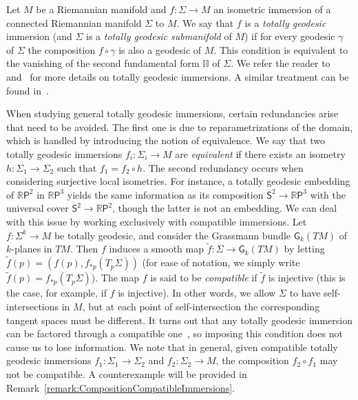 \documentclass[11pt,a4paper,final]{amsart}
\newcommand{\s}{\mathsf}
\newcommand{\R}{\mathbb{R}}
\renewcommand{\tilde}{\widetilde}
\theoremstyle{definition}
\begin{document}
Let $M$ be a Riemannian manifold and $f\colon \Sigma \to M$ an isometric immersion of a connected Riemannian manifold $\Sigma$ to $M$.
We say that $f$ is a \textit{totally geodesic} immersion (and $\Sigma$ is a \textit{totally geodesic submanifold} of $M$) if for every geodesic $\gamma$ of $\Sigma$ the composition $f\circ \gamma$ is also a geodesic of $M$.
This condition is equivalent to the vanishing of the second fundamental form $\mathbb{II}$ of $\Sigma$.
We refer the reader to~\cite[Appendix~A]{HeintzeLiuOlmos} and~\cite[Section~10.3]{BerndtConsoleOlmos} for more details on totally geodesic immersions.
A similar treatment can be found in~\cite{Tsukada}.

When studying general totally geodesic immersions, certain redundancies arise that need to be avoided.
The first one is due to reparametrizations of the domain, which is handled by introducing the notion of equivalence.
We say that two totally geodesic immersions $f_{i}\colon \Sigma_{i}\to M$ are \textit{equivalent} if there exists an isometry $h\colon \Sigma_{1}\to \Sigma_{2}$ such that $f_{1}=f_{2}\circ h$.
The second redundancy occurs when considering surjective local isometries.
For instance, a totally geodesic embedding of $\R\s{P}^2$ in $\R\s{P}^3$ yields the same information as its composition $\s{S}^{2}\to\R\s{P}^{3}$ with the universal cover $\s{S}^{2}\to\R\s{P}^{2}$, though the latter is not an embedding.
We can deal with this issue by working exclusively with compatible immersions.
Let $f\colon \Sigma^{k}\to M$ be totally geodesic, and consider the Grassmann bundle $\s{G}_{k}(TM)$ of $k$-planes in $TM$.
Then $f$ induces a smooth map $\tilde{f}\colon \Sigma \to \s{G}_{k}(TM)$ by letting $\tilde{f}(p)=(f(p),f_{*p}(T_{p}\Sigma))$ (for ease of notation, we simply write $\tilde{f}(p)=f_{*p}(T_{p}\Sigma)$).
The map $f$ is said to be \textit{compatible} if $\tilde{f}$ is injective (this is the case, for example, if $f$ is injective).
In other words, we allow $\Sigma$ to have self-intersections in $M$, but at each point of self-intersection the corresponding tangent spaces must be different.
It turns out that any totally geodesic immersion can be factored through a compatible one~\cite[p.~272]{BerndtConsoleOlmos}, so imposing this condition does not cause us to lose information.
We note that in general, given compatible totally geodesic immersions $f_{1}\colon \Sigma_{1}\to\Sigma_{2}$ and $f_{2}\colon \Sigma_{2}\to M$, the composition $f_{2}\circ f_{1}$ may not be compatible.
A counterexample will be provided in Remark~\ref{remark:CompositionCompatibleImmersions}.
\end{document}
